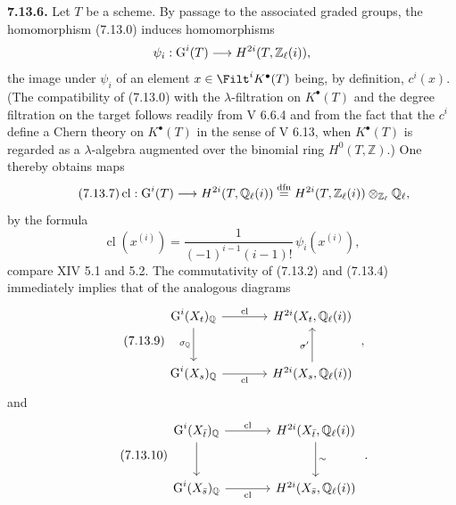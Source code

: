\textbf{7.13.6.}
Let $T$ be a scheme. By passage to the associated graded groups, the
homomorphism (7.13.0) induces homomorphisms
\[
\psi_i:\operatorname{G}^i(T)\longrightarrow H^{2i}(T,\mathbb Z_\ell(i)),
\]
the image under $\psi_i$ of an element $x\in\Filt^iK^\bullet(T)$ being, by
definition, $c^i(x)$. (The compatibility of (7.13.0) with the
$\lambda$-filtration on
$K^\bullet(T)$ and the degree filtration on the target follows readily from
V 6.6.4 and from the fact that the $c^i$ define a
Chern theory on $K^\bullet(T)$ in the sense of V 6.13, when $K^\bullet(T)$ is
regarded as a $\lambda$-algebra augmented over the binomial ring
$H^0(T,\mathbb Z)$.) One thereby obtains maps
\begin{equation}\tag{7.13.7}
\operatorname{cl}:\operatorname{G}^i(T)\longrightarrow H^{2i}(T,\mathbb Q_\ell(i))
\stackrel{\mathrm{dfn}}{=}
H^{2i}(T,\mathbb Z_\ell(i))\otimes_{\mathbb Z_\ell}\mathbb Q_\ell,
\end{equation}
by the formula
\begin{equation}\tag{7.13.8}
\operatorname{cl}(x^{(i)})=
\frac{1}{(-1)^{i-1}(i-1)!}\,\psi_i(x^{(i)}),
\end{equation}
compare XIV 5.1 and 5.2. The commutativity of (7.13.2) and (7.13.4)
immediately implies that of the analogous diagrams
\begin{equation}\tag{7.13.9}
\begin{tikzcd}[column sep=large,row sep=large]
\Gr^i(X_t)_{\mathbb Q} \arrow[r,"\operatorname{cl}"]
  \arrow[d,"\sigma_{\mathbb Q}"'] &
H^{2i}(X_t,\mathbb Q_\ell(i))\\
\Gr^i(X_s)_{\mathbb Q} \arrow[r,"\operatorname{cl}"'] &
H^{2i}(X_s,\mathbb Q_\ell(i)) \arrow[u,"\sigma'"]
\end{tikzcd}
\;,
\end{equation}
and
\begin{equation}\tag{7.13.10}
\begin{tikzcd}[column sep=large,row sep=large]
\Gr^i(X_{\bar t})_{\mathbb Q} \arrow[r,"\operatorname{cl}"] \arrow[d] &
H^{2i}(X_{\bar t},\mathbb Q_\ell(i)) \arrow[d,"\sim"]\\
\Gr^i(X_{\bar s})_{\mathbb Q} \arrow[r,"\operatorname{cl}"'] &
H^{2i}(X_{\bar s},\mathbb Q_\ell(i))
\end{tikzcd}
\;.
\end{equation}

